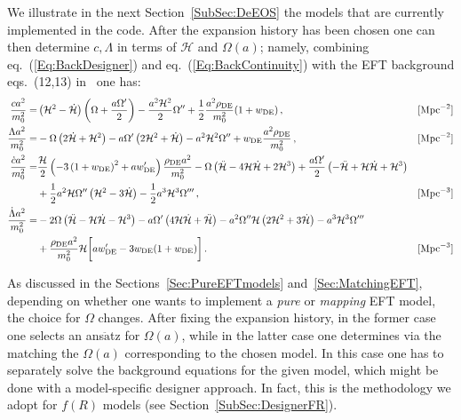 \documentclass[prd,nofootinbib,showpacs]{revtex4}
\def\hub{{\mathcal H}}
\begin{document}
{We illustrate in the next Section~\ref{SubSec:DeEOS} the models that are currently  implemented in the code. After the expansion history has been chosen one can then determine $c,\Lambda$ in terms of $\hub$ and $\Omega(a)$; namely, combining  eq.~(\ref{Eq:BackDesigner}) and eq.~(\ref{Eq:BackContinuity}) with the EFT background eqs.~(12,13) in~\cite{Hu:2013twa} one has:
%
\begin{align}\label{Eq:DesignerCLambda}
\frac{c a^2}{m_0^2} =& \left(\mathcal{H}^2- \dot{\mathcal{H}}\right) \left(\Omega +\frac{a\Omega^\prime}{2} \right) -\frac{a^2\mathcal{H}^2}{2}\Omega^{\prime\prime} + \frac{1}{2}\frac{a^2 \rho_{\rm DE}}{m_0^2}(1+w_{\rm DE})\, , & &   [\text{Mpc}^{-2}] \\
%
 \frac{\Lambda a^2}{m_0^2} =& -\Omega\left(2\mathcal{\dot{H}} + \mathcal{H}^2\right) -a\Omega^\prime \left(2\mathcal{H}^2 + \dot{\mathcal{H}} \right) - a^2\mathcal{H}^2 \Omega^{\prime \prime} + w_{\rm DE}\frac{a^2\rho_{\rm DE}}{m_0^2}\, , & & [\text{Mpc}^{-2}]  \\
%
\frac{\dot{c} a^2}{m_0^2} =& \frac{\mathcal{H}}{2}\left(-3 \left(1+w_{\rm DE}\right)^2+ a w^\prime_{\rm DE} \right)\frac{\rho_{\rm DE} a^2}{m_0^2} -\Omega \left(\ddot{\mathcal{H}}-4 \mathcal{H} \dot{\mathcal{H}} + 2 \mathcal{H}^3 \right)  + \frac{a\Omega^\prime}{2} \left(-\ddot{\mathcal{H}} + \mathcal{H}\dot{\mathcal{H}} +\mathcal{H}^3  \right) \nonumber \\
 &  +\frac{1}{2}a^2 \mathcal{H} \Omega^{\prime \prime}\left(\mathcal{H}^2 -3 \dot{\mathcal{H}} \right) -\frac{1}{2} a^3 \mathcal{H}^3 \Omega^{\prime\prime\prime}\, , & & [\text{Mpc}^{-3}] \\
%
\frac{\dot{\Lambda} a^2}{m_0^2} =& -2\Omega\left(\ddot{\mathcal{H}}- \mathcal{H} \dot{\mathcal{H}} -\mathcal{H}^3 \right) -a\Omega^{\prime}\left(4\mathcal{H}\dot{\mathcal{H}}+\ddot{\mathcal{H}}\right)  - a^2\Omega^{\prime\prime}\mathcal{H}\left(2\mathcal{H}^2+3\dot{\mathcal{H}}\right)-a^3\mathcal{H}^3\Omega^{\prime\prime\prime} \nonumber\\
        & + \frac{\rho_{\rm DE} a^2}{m_0^2} \mathcal{H}\bigg[a w^\prime_{\rm DE} -3 w_{\rm DE}(1+w_{\rm DE}) \bigg] \, .& & [\text{Mpc}^{-3}]
\end{align}

As discussed in the Sections~\ref{Sec:PureEFTmodels} and~\ref{Sec:MatchingEFT}, depending on whether one wants to implement a \emph{pure} or \emph{mapping} EFT model, the choice for $\Omega$ changes. After fixing the expansion history, in the former case one selects an ans$\ddot{\text{a}}$tz for $\Omega(a)$, while in the latter case one determines via the matching the $\Omega(a)$ corresponding to the chosen model. In this case one has to separately solve the background equations for the given model, which might be done with a model-specific designer approach. In fact, this is the methodology we adopt for $f(R)$ models (see Section~\ref{SubSec:DesignerFR}).

}
\end{document}
